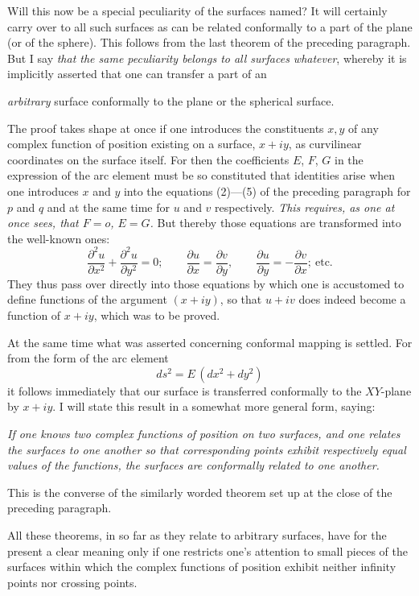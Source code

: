 \documentclass{article}
\begin{document}
Will this now be a special peculiarity of the surfaces named? It will certainly carry over to all such surfaces as can be related conformally to a part of the plane (or of the sphere). This follows from the last theorem of the preceding paragraph. But I say \emph{that the same peculiarity belongs to all surfaces whatever}, whereby it is implicitly asserted that one can transfer a part of an

\emph{arbitrary} surface conformally to the plane or the spherical surface.

The proof takes shape at once if one introduces the constituents $x, y$ of any complex function of position existing on a surface, $x + iy$, as curvilinear coordinates on the surface itself. For then the coefficients $E$, $F$, $G$ in the expression of the arc element must be so constituted that identities arise when one introduces $x$ and $y$ into the equations (2)---(5) of the preceding paragraph for $p$ and $q$ and at the same time for $u$ and $v$ respectively. \emph{This requires, as one at once sees, that $F = o$, $E = G$.} But thereby those equations are transformed into the well-known ones:
\[ \frac{\partial^{2} u}{\partial x^{2}} + \frac{\partial^{2} u}{\partial y^{2}} = 0; \qquad \frac{\partial u}{\partial x} = \frac{\partial v}{\partial y}, \qquad \frac{\partial u}{\partial y} = - \frac{\partial v}{\partial x}; \ \text{etc.} \]
They thus pass over directly into those equations by which one is accustomed to define functions of the argument $(x + iy)$, so that $u + iv$ does indeed become a function of $x + iy$, which was to be proved.

At the same time what was asserted concerning conformal mapping is settled. For from the form of the arc element
\[ ds^{2} = E\,(dx^{2} + dy^{2}) \]
it follows immediately that our surface is transferred conformally to the $XY$-plane by $x + iy$. I will state this result in a somewhat more general form, saying:

\emph{If one knows two complex functions of position on two surfaces, and one relates the surfaces to one another so that corresponding points exhibit respectively equal values of the functions, the surfaces are conformally related to one another.}

This is the converse of the similarly worded theorem set up at the close of the preceding paragraph.

All these theorems, in so far as they relate to arbitrary surfaces, have for the present a clear meaning only if one restricts one's attention to small pieces of the surfaces within which the complex functions of position exhibit neither infinity points nor crossing points.
\end{document}
